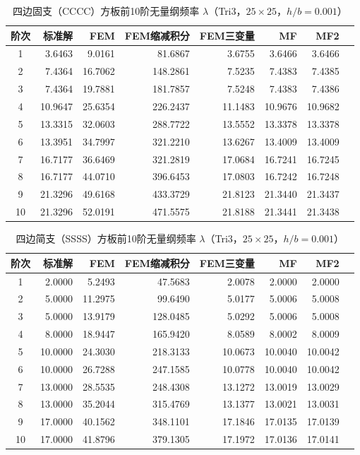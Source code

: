 \begin{table}[H]
\centering
\caption{四边固支（CCCC）方板前10阶无量纲频率 $\lambda$（Tri3，$25\times25$，$h/b=0.001$）}
\label{tab:vib_cccc}
\begin{tabular}{crrrrrrr}
\hline
阶次 & 标准解\cite{liew1993} & FEM & FEM缩减积分 & FEM三变量 & MF & MF2 \\
\hline
1 & 3.6463 & 9.0161 & 81.6867 & 3.6755 & 3.6466 & 3.6466 \\
2 & 7.4364 & 16.7062 & 148.2861 & 7.5235 & 7.4383 & 7.4385 \\
3 & 7.4364 & 19.7881 & 181.7857 & 7.5248 & 7.4383 & 7.4386 \\
4 & 10.9647 & 25.6354 & 226.2437 & 11.1483 & 10.9676 & 10.9682 \\
5 & 13.3315 & 32.0603 & 288.7722 & 13.5552 & 13.3378 & 13.3378 \\
6 & 13.3951 & 34.7997 & 321.2210 & 13.6267 & 13.4009 & 13.4009 \\
7 & 16.7177 & 36.6469 & 321.2819 & 17.0684 & 16.7241 & 16.7245 \\
8 & 16.7177 & 44.0710 & 396.6453 & 17.0803 & 16.7242 & 16.7248 \\
9 & 21.3296 & 49.6168 & 433.3729 & 21.8123 & 21.3440 & 21.3437 \\
10 & 21.3296 & 52.0191 & 471.5575 & 21.8188 & 21.3441 & 21.3438 \\
\hline
\end{tabular}
\end{table}

\begin{table}[H]
\centering
\caption{四边简支（SSSS）方板前10阶无量纲频率 $\lambda$（Tri3，$25\times25$，$h/b=0.001$）}
\label{tab:vib_ssss}
\begin{tabular}{crrrrrrr}
\hline
阶次 & 标准解 & FEM & FEM缩减积分 & FEM三变量 & MF & MF2 \\
\hline
1 & 2.0000 & 5.2493 & 47.5683 & 2.0078 & 2.0000 & 2.0000 \\
2 & 5.0000 & 11.2975 & 99.6490 & 5.0177 & 5.0006 & 5.0008 \\
3 & 5.0000 & 13.9179 & 128.0485 & 5.0292 & 5.0006 & 5.0008 \\
4 & 8.0000 & 18.9447 & 165.9420 & 8.0589 & 8.0002 & 8.0009 \\
5 & 10.0000 & 24.3030 & 218.3133 & 10.0673 & 10.0040 & 10.0042 \\
6 & 10.0000 & 26.7288 & 247.1585 & 10.0778 & 10.0040 & 10.0042 \\
7 & 13.0000 & 28.5535 & 248.4308 & 13.1272 & 13.0019 & 13.0029 \\
8 & 13.0000 & 35.2044 & 315.4769 & 13.1377 & 13.0021 & 13.0031 \\
9 & 17.0000 & 40.1562 & 348.1101 & 17.1846 & 17.0135 & 17.0139 \\
10 & 17.0000 & 41.8796 & 379.1305 & 17.1972 & 17.0136 & 17.0141 \\
\hline
\end{tabular}
\end{table}

